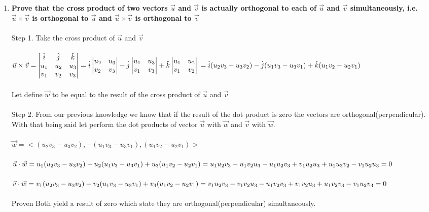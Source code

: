 \documentclass{article}
\begin{document}
\begin{enumerate}[3.]
\item\textbf{Prove that the cross product of two vectors $\vec{u}$ and $\vec{v}$ is actually orthogonal to each of $\vec{u}$ and $\vec{v}$ simultaneously, i.e. $\vec{u}\times\vec{v}$ is orthogonal to $\vec{u}$ and $\vec{u}\times\vec{v}$ is
orthogonal to $\vec{v}$ }
\\
\\
Step 1. Take the cross product of $\vec{u}$ and $\vec{v}$\\
\\
$\vec{u}\times\vec{v}=\begin{vmatrix}
\hat{i}&\hat{j}&\hat{k}\\
u_{1}&u_{2}&u_{3}\\
v_{1}&v_{2}&v_{3}\\
\end{vmatrix}=\hat{i}
\begin{vmatrix}
u_{2}&u_{3}\\
v_{2}&v_{3}\\
\end{vmatrix}-\hat{j}\begin{vmatrix}
u_{1}&u_{3}\\
v_{1}&v_{3}\\
\end{vmatrix}+\hat{k}\begin{vmatrix}
u_{1}&u_{2}\\
v_{1}&v_{2}\\
\end{vmatrix}\\
=\hat{i}(u_{2}v_{3}-u_{3}v_{2})-\hat{j}(u_{1}v_{3}-u_{3}v_{1})+\hat{k}(u_{1}v_{2}-u_{2}v_{1})$\\
\\
Let define $\vec{w}$ to be equal to the result of the cross product of $\vec{u}$ and $\vec{v}$\\
\\
Step 2. From our previous knowledge we know that if the result of the dot product is zero the vectors are orthogonal(perpendicular). With that being said let perform the dot products of vector $\vec{u}$ with $\vec{w}$ and $\vec{v}$ with $\vec{w}$.\\
\\
$\vec{w} = <(u_{2}v_{3}-u_{3}v_{2}),-(u_{1}v_{3}-u_{3}v_{1}),(u_{1}v_{2}-u_{2}v_{1})>$\\
\\
$\vec{u}\cdot\vec{w}=u_{1}(u_{2}v_{3}-u_{3}v_{2})-u_{2}(u_{1}v_{3}-u_{3}v_{1})+u_{3}(u_{1}v_{2}-u_{2}v_{1})\\=u_{1}u_{2}v_{3}-u_{1}v_{2}u_{3}-u_{1}u_{2}v_{3}+v_{1}u_{2}u_{3}+u_{1}u_{3}v_{2}-v_{1}u_{2}u_{3}=0$\\
\\ 
$\vec{v}\cdot\vec{w}=v_{1}(u_{2}v_{3}-u_{3}v_{2})-v_{2}(u_{1}v_{3}-u_{3}v_{1})+v_{3}(u_{1}v_{2}-u_{2}v_{1})\\=v_{1}u_{2}v_{3}-v_{1}v_{2}u_{3}-u_{1}v_{2}v_{3}+v_{1}v_{2}u_{3}+u_{1}v_{2}v_{3}-v_{1}u_{2}v_{3}=0$\\
\\
Proven Both yield a result of zero which state they are orthogonal(perpendicular) simultaneously.
\end{enumerate}
\end{document}
